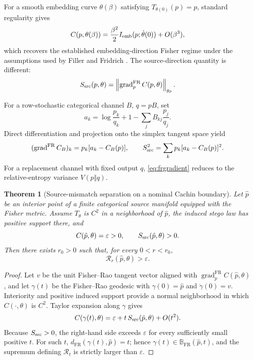 \documentclass[10pt]{article}
\newtheorem{theorem}{Theorem}
\newcommand{\RR}{\mathcal{R}}
\newcommand{\FR}{\mathrm{FR}}
\begin{document}
For a smooth embedding curve \(\theta(\beta)\) satisfying \(T_{\theta(0)}(p)=p\), standard regularity gives
\begin{equation}
 C(p,\theta(\beta))
 =
 \frac{\beta^2}{2}I_{\rm emb}(p;\dot\theta(0))+O(\beta^3),
 \label{eq:fillerrecovery}
\end{equation}
which recovers the established embedding-direction Fisher regime under the assumptions used by Filler and Fridrich \cite{filler2009icas,filler2009ih}. The source-direction quantity is different:
\begin{equation}
 S_{\rm src}(p,\theta)
 =
 \left\|\operatorname{grad}^{\FR}_{p}C(p,\theta)\right\|_{g_p}.
 \label{eq:ssrc}
\end{equation}

For a row-stochastic categorical channel \(B\), \(q=pB\), set
\begin{equation}
 a_k=
 \log\frac{p_k}{q_k}+1-\sum_j B_{kj}\frac{p_j}{q_j}.
 \label{eq:ak}
\end{equation}
Direct differentiation and projection onto the simplex tangent space yield
\begin{equation}
 (\operatorname{grad}^{\FR}C_B)_k
 =p_k[a_k-C_B(p)],
 \qquad
 S_{\rm src}^2
 =\sum_k p_k[a_k-C_B(p)]^2.
 \label{eq:frgradient}
\end{equation}
For a replacement channel with fixed output \(q\), \cref{eq:frgradient} reduces to the relative-entropy variance \(V(p\Vert q)\).

\begin{theorem}[Source-mismatch separation on a nominal Cachin boundary]
\label{thm:separation}
Let \(\hat p\) be an interior point of a finite categorical source manifold equipped with the Fisher metric. Assume \(T_\theta\) is \(C^2\) in a neighborhood of \(\hat p\), the induced stego law has positive support there, and
\[
C(\hat p,\theta)=\varepsilon>0,
\qquad
S_{\rm src}(\hat p,\theta)>0.
\]
Then there exists \(r_0>0\) such that, for every \(0<r<r_0\),
\[
\RR_r(\hat p,\theta)>\varepsilon.
\]
\end{theorem}

\begin{proof}
Let \(v\) be the unit Fisher--Rao tangent vector aligned with
\(\operatorname{grad}^{\FR}_{p}C(\hat p,\theta)\), and let \(\gamma(t)\) be the Fisher--Rao geodesic with \(\gamma(0)=\hat p\) and \(\dot\gamma(0)=v\). Interiority and positive induced support provide a normal neighborhood in which \(C(\cdot,\theta)\) is \(C^2\). Taylor expansion along \(\gamma\) gives
\[
C(\gamma(t),\theta)
=
\varepsilon+t\,S_{\rm src}(\hat p,\theta)+O(t^2).
\]
Because \(S_{\rm src}>0\), the right-hand side exceeds \(\varepsilon\) for every sufficiently small positive \(t\). For such \(t\), \(d_{\FR}(\gamma(t),\hat p)=t\); hence \(\gamma(t)\in\mathbb B_{\FR}(\hat p,t)\), and the supremum defining \(\RR_t\) is strictly larger than \(\varepsilon\).
\end{proof}
\end{document}
